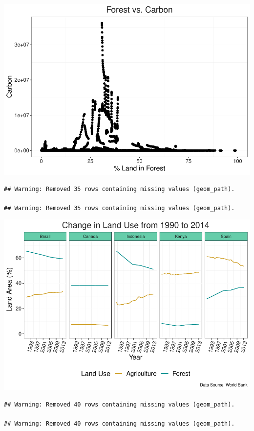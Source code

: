 \documentclass[12pt,]{article}
\begin{document}
\includegraphics{Marx_ENV872_Project_files/figure-latex/unnamed-chunk-5-2.pdf}

\begin{verbatim}
## Warning: Removed 35 rows containing missing values (geom_path).

## Warning: Removed 35 rows containing missing values (geom_path).
\end{verbatim}

\includegraphics{Marx_ENV872_Project_files/figure-latex/unnamed-chunk-6-1.pdf}

\begin{verbatim}
## Warning: Removed 40 rows containing missing values (geom_path).

## Warning: Removed 40 rows containing missing values (geom_path).
\end{verbatim}
\end{document}
